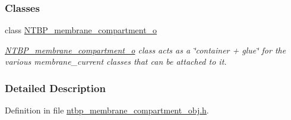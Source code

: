 \subsubsection*{Classes}
\begin{DoxyCompactItemize}
\item 
class \hyperlink{class_n_t_b_p__membrane__compartment__o}{NTBP\_\-membrane\_\-compartment\_\-o}
\begin{DoxyCompactList}\small\item\em \hyperlink{class_n_t_b_p__membrane__compartment__o}{NTBP\_\-membrane\_\-compartment\_\-o} class acts as a \char`\"{}container + glue\char`\"{} for the various membrane\_\-current classes that can be attached to it. \item\end{DoxyCompactList}\end{DoxyCompactItemize}


\subsubsection{Detailed Description}


Definition in file \hyperlink{ntbp__membrane__compartment__obj_8h_source}{ntbp\_\-membrane\_\-compartment\_\-obj.h}.

